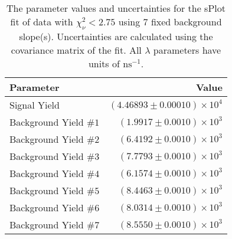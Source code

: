 
\begin{table}
    \begin{center}
        \begin{tabular}{lr}\toprule
            Parameter & Value \\\midrule
            Signal Yield & $(4.46893 \pm 0.00010) \times 10^{4}$ \\
            Background Yield $\#1$ & $(1.9917 \pm 0.0010) \times 10^{3}$ \\
            Background Yield $\#2$ & $(6.4192 \pm 0.0010) \times 10^{3}$ \\
            Background Yield $\#3$ & $(7.7793 \pm 0.0010) \times 10^{3}$ \\
            Background Yield $\#4$ & $(6.1574 \pm 0.0010) \times 10^{3}$ \\
            Background Yield $\#5$ & $(8.4463 \pm 0.0010) \times 10^{3}$ \\
            Background Yield $\#6$ & $(8.0314 \pm 0.0010) \times 10^{3}$ \\
            Background Yield $\#7$ & $(8.5550 \pm 0.0010) \times 10^{3}$ \\\bottomrule
        \end{tabular}
        \caption{The parameter values and uncertainties for the sPlot fit of data with $\chi^2_\nu < 2.75$ using 7 fixed background slope(s). Uncertainties are calculated using the covariance matrix of the fit. All $\lambda$ parameters have units of $\si{\nano\second}^{-1}$.}
    \end{center}
\end{table}
